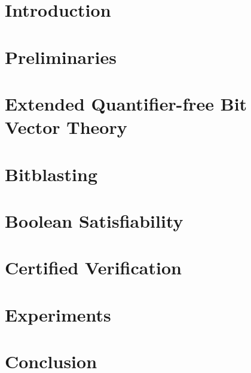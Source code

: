 \documentclass[10pt,conference,letterpaper]{IEEEtran}
\begin{document}

\section{Introduction}
\label{section:introduction}

\section{Preliminaries}
\label{section:preliminaries}

\section{\cryptoline}
\label{section:cryptoline}

\section{Extended Quantifier-free Bit Vector Theory}
\label{section:qfbv-semantics}

\section{Bitblasting}
\label{section:bitblasting}

\section{Boolean Satisfiability}
\label{section:sat}

\section{Certified Verification}
\label{section:certified-verification}

\section{Experiments}
\label{section:experiments}

\section{Conclusion}
\label{section:conclusion}



\end{document}
